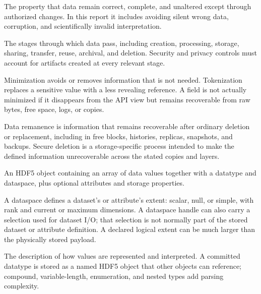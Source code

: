 \documentclass[../main.tex]{subfiles}
\begin{document}
\begin{description}[leftmargin=1.5em,style=nextline]

\item[Data integrity.]
The property that data remain correct, complete, and unaltered except through
authorized changes. In this report it includes avoiding silent wrong data,
corruption, and scientifically invalid interpretation.

\item[Data lifecycle.]
The stages through which data pass, including creation, processing, storage,
sharing, transfer, reuse, archival, and deletion. Security and privacy controls
must account for artifacts created at every relevant stage.

\item[Data minimization / tokenization.]
Minimization avoids or removes information that is not needed. Tokenization
replaces a sensitive value with a less revealing reference. A field is not
actually minimized if it disappears from the API view but remains recoverable
from raw bytes, free space, logs, or copies.

\item[Data remanence / secure deletion.]
Data remanence is information that remains recoverable after ordinary deletion
or replacement, including in free blocks, histories, replicas, snapshots, and
backups. Secure deletion is a storage-specific process intended to make the
defined information unrecoverable across the stated copies and layers.

\item[Dataset.]
An HDF5 object containing an array of data values together with a datatype and
dataspace, plus optional attributes and storage properties.

\item[Dataspace.]
A dataspace defines a dataset's or attribute's extent: scalar, null, or simple,
with rank and current or maximum dimensions. A dataspace handle can also carry
a selection used for dataset I/O; that selection is not normally part of the
stored dataset or attribute definition. A declared logical extent can be much
larger than the physically stored payload.

\item[Datatype / committed datatype.]
The description of how values are represented and interpreted. A committed
datatype is stored as a named HDF5 object that other objects can reference;
compound, variable-length, enumeration, and nested types add parsing complexity.


\end{description}
\end{document}
